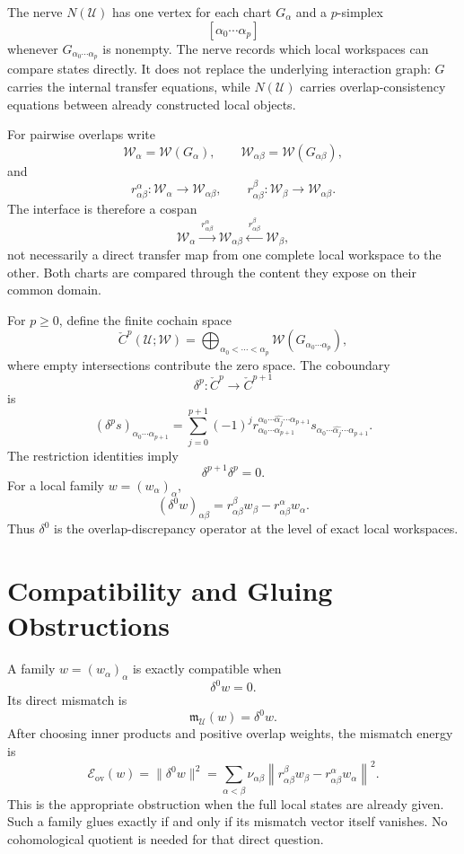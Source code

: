 
The nerve \(N(\mathcal U)\) has one vertex for each chart \(G_\alpha\) and a
\(p\)-simplex
\[
[\alpha_0\cdots\alpha_p]
\]
whenever \(G_{\alpha_0\cdots\alpha_p}\) is nonempty. The nerve records which
local workspaces can compare states directly. It does not replace the
underlying interaction graph: \(G\) carries the internal transfer equations,
while \(N(\mathcal U)\) carries overlap-consistency equations between already
constructed local objects.

For pairwise overlaps write
\[
\mathscr W_\alpha=\mathscr W(G_\alpha),
\qquad
\mathscr W_{\alpha\beta}=\mathscr W(G_{\alpha\beta}),
\]
and
\[
r_{\alpha\beta}^{\alpha}:
\mathscr W_\alpha\to\mathscr W_{\alpha\beta},
\qquad
r_{\alpha\beta}^{\beta}:
\mathscr W_\beta\to\mathscr W_{\alpha\beta}.
\]
The interface is therefore a cospan
\[
\mathscr W_\alpha
\xrightarrow{\ r_{\alpha\beta}^{\alpha}\ }
\mathscr W_{\alpha\beta}
\xleftarrow{\ r_{\alpha\beta}^{\beta}\ }
\mathscr W_\beta,
\]
not necessarily a direct transfer map from one complete local workspace to the
other. Both charts are compared through the content they expose on their
common domain.


For \(p\geq0\), define the finite cochain space
\[
\check C^p(\mathcal U;\mathscr W)
=
\bigoplus_{\alpha_0<\cdots<\alpha_p}
\mathscr W(G_{\alpha_0\cdots\alpha_p}),
\]
where empty intersections contribute the zero space. The coboundary
\[
\delta^p:\check C^p\longrightarrow\check C^{p+1}
\]
is
\[
\boxed{
(\delta^p s)_{\alpha_0\cdots\alpha_{p+1}}
=
\sum_{j=0}^{p+1}(-1)^j
r_{\alpha_0\cdots\alpha_{p+1}}^%
{\alpha_0\cdots\widehat{\alpha_j}\cdots\alpha_{p+1}}
%
s_{\alpha_0\cdots\widehat{\alpha_j}\cdots\alpha_{p+1}}.
}
\]
The restriction identities imply
\[
\delta^{p+1}\delta^p=0.
\]
For a local family \(w=(w_\alpha)_\alpha\),
\[
\boxed{
(\delta^0w)_{\alpha\beta}
=
r_{\alpha\beta}^{\beta}w_\beta
-
r_{\alpha\beta}^{\alpha}w_\alpha.
}
\]
Thus \(\delta^0\) is the overlap-discrepancy operator at the level of exact
local workspaces.

\section{Compatibility and Gluing Obstructions}


A family \(w=(w_\alpha)_\alpha\) is exactly compatible when
\[
\delta^0w=0.
\]
Its direct mismatch is
\[
\boxed{
\mathfrak m_{\mathcal U}(w)=\delta^0w.
}
\]
After choosing inner products and positive overlap weights, the mismatch
energy is
\[
\boxed{
\mathcal E_{\mathrm{ov}}(w)
=
\|\delta^0w\|^2
=
\sum_{\alpha<\beta}
\nu_{\alpha\beta}
\left\|
 r_{\alpha\beta}^{\beta}w_\beta
-r_{\alpha\beta}^{\alpha}w_\alpha
\right\|^2.
}
\]
This is the appropriate obstruction when the full local states are already
given. Such a family glues exactly if and only if its mismatch vector itself
vanishes. No cohomological quotient is needed for that direct question.

